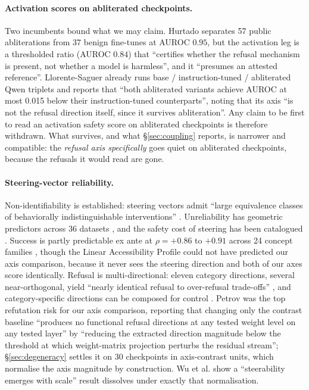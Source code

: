 \documentclass[11pt,letterpaper]{article}
\begin{document}
\paragraph{Activation scores on abliterated checkpoints.} Two incumbents bound what we may claim. Hurtado \citep{Hurtado2026} separates 57 public abliterations from 37 benign fine-tunes at AUROC $0.95$, but the activation leg is a thresholded ratio (AUROC $0.84$) that ``certifies whether the refusal mechanism is present, not whether a model is harmless'', and it ``presumes an attested reference''. Llorente-Saguer \citep{Llorente2026} already runs base / instruction-tuned / abliterated Qwen triplets and reports that ``both abliterated variants achieve AUROC at most 0.015 below their instruction-tuned counterparts'', noting that its axis ``is not the refusal direction itself, since it survives abliteration''. Any claim to be first to read an activation safety score on abliterated checkpoints is therefore withdrawn. What survives, and what \S\ref{sec:coupling} reports, is narrower and compatible: the \emph{refusal axis specifically} goes quiet on abliterated checkpoints, because the refusals it would read are gone.

\paragraph{Steering-vector reliability.} Non-identifiability is established: steering vectors admit ``large equivalence classes of behaviorally indistinguishable interventions'' \citep{Venkatesh2026}. Unreliability has geometric predictors across 36 datasets \citep{Braun2026}, and the safety cost of steering has been catalogued \citep{LiSteer2026}. Success is partly predictable ex ante at $\rho = +0.86$ to $+0.91$ across 24 concept families \citep{Billa2026}, though the Linear Accessibility Profile could not have predicted our axis comparison, because it never sees the steering direction and both of our axes score identically. Refusal is multi-directional: eleven category directions, several near-orthogonal, yield ``nearly identical refusal to over-refusal trade-offs'' \citep{Joad2026}, and category-specific directions can be composed for control \citep{Alagharu2026}. Petrov \citep{Petrov2026} was the top refutation risk for our axis comparison, reporting that changing only the contrast baseline ``produces no functional refusal directions at any tested weight level on any tested layer'' by ``reducing the extracted direction magnitude below the threshold at which weight-matrix projection perturbs the residual stream''; \S\ref{sec:degeneracy} settles it on 30 checkpoints in axis-contrast units, which normalise the axis magnitude by construction. Wu et al. \citep{Wu2026} show a ``steerability emerges with scale'' result dissolves under exactly that normalisation.
\end{document}
